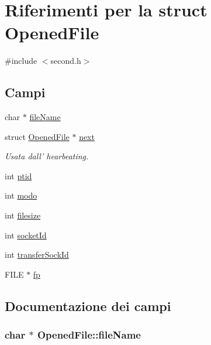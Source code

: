 \hypertarget{structOpenedFile}{\section{Riferimenti per la struct Opened\+File}
\label{structOpenedFile}
}


{\ttfamily \#include $<$second.\+h$>$}

\subsection*{Campi}
\begin{DoxyCompactItemize}
\item 
char $\ast$ \hyperlink{structOpenedFile_abcff0610dfa8b1e3836b3f5bac40c8f5}{file\+Name}
\item 
struct \hyperlink{structOpenedFile}{Opened\+File} $\ast$ \hyperlink{structOpenedFile_a9b8c8b995cdda6da249a6ce9a9df98b2}{next}
\begin{DoxyCompactList}\small\item\em Usata dall' hearbeating. \end{DoxyCompactList}\item 
int \hyperlink{structOpenedFile_aba1e9ae457adfa6a9cc6a22ca4ee290d}{ptid}
\item 
int \hyperlink{structOpenedFile_a6d9f22ff6ba81506ba9c4a60f27c4f32}{modo}
\item 
int \hyperlink{structOpenedFile_a3b2e157f5aad06b65bd017d67fde4eb3}{filesize}
\item 
int \hyperlink{structOpenedFile_a2af35018ecff06dbd349d464c815038a}{socket\+Id}
\item 
int \hyperlink{structOpenedFile_a122a7d3d722dc1f7c63857af2024f098}{transfer\+Sock\+Id}
\item 
F\+I\+L\+E $\ast$ \hyperlink{structOpenedFile_a9cdcaccacb2eb66a17c0781666c28b15}{fp}
\end{DoxyCompactItemize}


\subsection{Documentazione dei campi}
\hypertarget{structOpenedFile_abcff0610dfa8b1e3836b3f5bac40c8f5}{
\subsubsection[{file\+Name}]{\setlength{\rightskip}{0pt plus 5cm}char $\ast$ Opened\+File\+::file\+Name}}\label{structOpenedFile_abcff0610dfa8b1e3836b3f5bac40c8f5}


